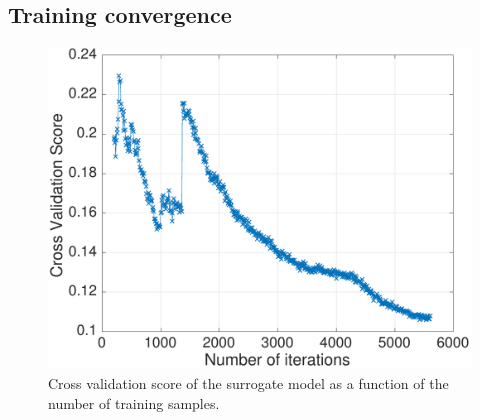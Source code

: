 %



\subsection{Training convergence}
\begin{figure}[t]
  \centering
  \includegraphics[width=0.75\columnwidth]{figures/throughput-cv}
  \caption{Cross validation score of the surrogate model as a function of the number of training samples. \label{fig:sumo-iteraton}}
\end{figure}

